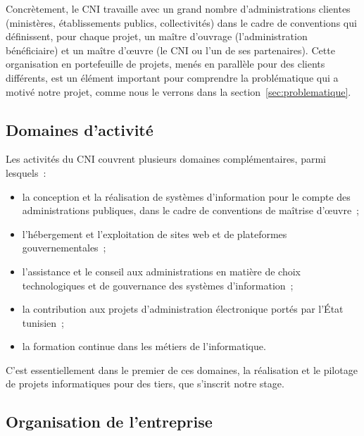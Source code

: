 
Concrètement, le CNI travaille avec un grand nombre d'administrations clientes (ministères, établissements publics, collectivités) dans le cadre de conventions qui définissent, pour chaque projet, un maître d'ouvrage (l'administration bénéficiaire) et un maître d'œuvre (le CNI ou l'un de ses partenaires). Cette organisation en portefeuille de projets, menés en parallèle pour des clients différents, est un élément important pour comprendre la problématique qui a motivé notre projet, comme nous le verrons dans la section~\ref{sec:problematique}.

\subsection{Domaines d'activité}
\label{subsec:domaines-activite}

Les activités du CNI couvrent plusieurs domaines complémentaires, parmi lesquels~:

\begin{itemize}[label=--]
    \item la conception et la réalisation de systèmes d'information pour le compte des administrations publiques, dans le cadre de conventions de maîtrise d'œuvre~;
    \item l'hébergement et l'exploitation de sites web et de plateformes gouvernementales~;
    \item l'assistance et le conseil aux administrations en matière de choix technologiques et de gouvernance des systèmes d'information~;
    \item la contribution aux projets d'administration électronique portés par l'État tunisien~;
    \item la formation continue dans les métiers de l'informatique.
\end{itemize}

C'est essentiellement dans le premier de ces domaines, la réalisation et le pilotage de projets informatiques pour des tiers, que s'inscrit notre stage.

\subsection{Organisation de l'entreprise}
\label{subsec:organisation-entreprise}

